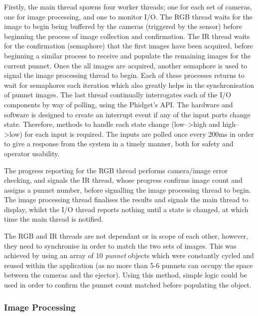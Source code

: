 \documentclass[fleqn,twoside,12pt]{report}
\begin{document}
Firstly, the main thread spawns four worker threads; one for each set of cameras, one for image processing, and one to monitor I/O. The RGB thread waits for the image to begin being buffered by the cameras (triggered by the sensor) before beginning the process of image collection and confirmation. The IR thread waits for the confirmation (semaphore) that the first images have been acquired, before beginning a similar process to receive and populate the remaining images for the current punnet. Once the all images are acquired, another semaphore is used to signal the image processing thread to begin. Each of these processes returns to wait for semaphores each iteration which also greatly helps in the synchronisation of punnet images. The last thread continually interrogates each of the I/O components by way of polling, using the Phidget\texttrademark's API. The hardware and software is designed to create an interrupt event if any of the input ports change state. Therefore, methods to handle each state change (low-->high and high-->low) for each input is required. The inputs are polled once every 200ms in order to give a response from the system in a timely manner, both for safety and operator usability.

The progress reporting for the RGB thread performs camera/image error checking, and signals the IR thread, whose progress confirms image count and assigns a punnet number, before signalling the image processing thread to begin. The image processing thread finalises the results and signals the main thread to display, whilst the I/O thread reports nothing until a state is changed, at which time the main thread is notified.


The RGB and IR threads are not dependant or in scope of each other, however, they need to synchronise in order to match the two sets of images. This was achieved by using an array of 10 \textit{punnet} objects which were constantly cycled and reused within the application (as no more than 5-6 punnets can occupy the space between the cameras and the ejector). Using this method, simple logic could be used in order to confirm the punnet count matched before populating the object. 



\subsubsection{Image Processing}
\end{document}
